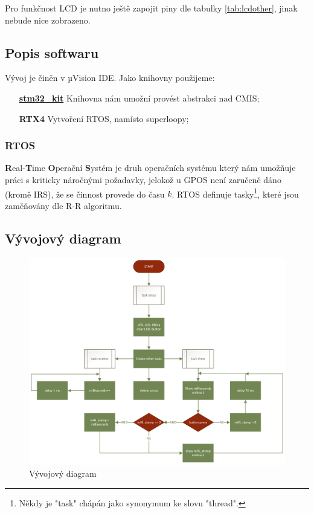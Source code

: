 \documentclass[10pt]{article}
\begin{document}
Pro funkčnost LCD je nutno ještě zapojit piny dle tabulky \ref{tab:lcdother},
jinak nebude nice zobrazeno. 

\subsection{Popis softwaru}

Vývoj je činěn v µVision IDE. Jako knihovny použijeme:

\begin{itemize}
    \item [\href{https://www.github.com/spsehavirov/stm32kit}{\textbf{stm32\_kit}}] Knihovna nám umožní provést abstrakci nad CMIS;

    \item [\textbf{RTX4}] Vytvoření RTOS, namísto superloopy;
\end{itemize}

\subsubsection{RTOS}

\textbf{R}eal-\textbf{T}ime \textbf{O}perační \textbf{S}ystém je druh operačních systému který nám umožňuje práci s kriticky náročnými požadavky,
jelokož u GPOS není zaručeně dáno (kromě IRS), že se činnost provede do času $k$. RTOS definuje tasky\footnote{Někdy je "task" chápán jako synonymum ke slovu "thread".}, které jsou zaměňovány dle R-R algoritmu.

\subsection{Vývojový diagram}

\begin{figure}[h]
    \centering
    \includegraphics[scale=0.35]{flowchart.png}
    \caption{Vývojový diagram}
\end{figure}
\end{document}
